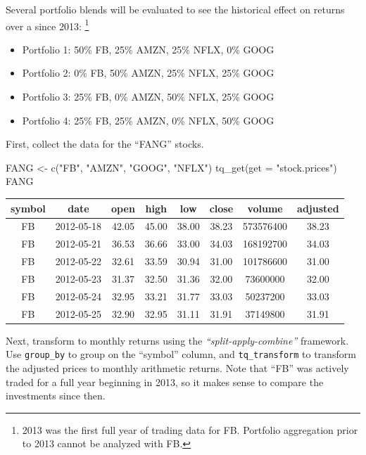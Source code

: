 Several portfolio blends will be evaluated to see the historical effect
on returns over a since 2013:
\footnote{2013 was the first full year of trading data for FB. Portfolio aggregation prior to 2013 cannot be analyzed with FB.}

\begin{itemize}
\tightlist
\item
  Portfolio 1: 50\% FB, 25\% AMZN, 25\% NFLX, 0\% GOOG
\item
  Portfolio 2: 0\% FB, 50\% AMZN, 25\% NFLX, 25\% GOOG
\item
  Portfolio 3: 25\% FB, 0\% AMZN, 50\% NFLX, 25\% GOOG
\item
  Portfolio 4: 25\% FB, 25\% AMZN, 0\% NFLX, 50\% GOOG
\end{itemize}

First, collect the data for the ``FANG'' stocks.

\begin{Schunk}
\begin{Sinput}
FANG <- c("FB", "AMZN", "GOOG", "NFLX") %
    tq_get(get = "stock.prices")
FANG
\end{Sinput}
\end{Schunk}

\begin{tabular}{cccccccc}
\toprule
symbol & date & open & high & low & close & volume & adjusted\\
\midrule
FB & 2012-05-18 & 42.05 & 45.00 & 38.00 & 38.23 & 573576400 & 38.23\\
FB & 2012-05-21 & 36.53 & 36.66 & 33.00 & 34.03 & 168192700 & 34.03\\
FB & 2012-05-22 & 32.61 & 33.59 & 30.94 & 31.00 & 101786600 & 31.00\\
FB & 2012-05-23 & 31.37 & 32.50 & 31.36 & 32.00 & 73600000 & 32.00\\
FB & 2012-05-24 & 32.95 & 33.21 & 31.77 & 33.03 & 50237200 & 33.03\\
FB & 2012-05-25 & 32.90 & 32.95 & 31.11 & 31.91 & 37149800 & 31.91\\
\bottomrule
\end{tabular}

\hspace{20 mm}

Next, transform to monthly returns using the
\emph{``split-apply-combine''} framework. Use \texttt{group\_by} to
group on the ``symbol'' column, and \texttt{tq\_transform} to transform
the adjusted prices to monthly arithmetic returns. Note that ``FB'' was
actively traded for a full year beginning in 2013, so it makes sense to
compare the investments since then.

